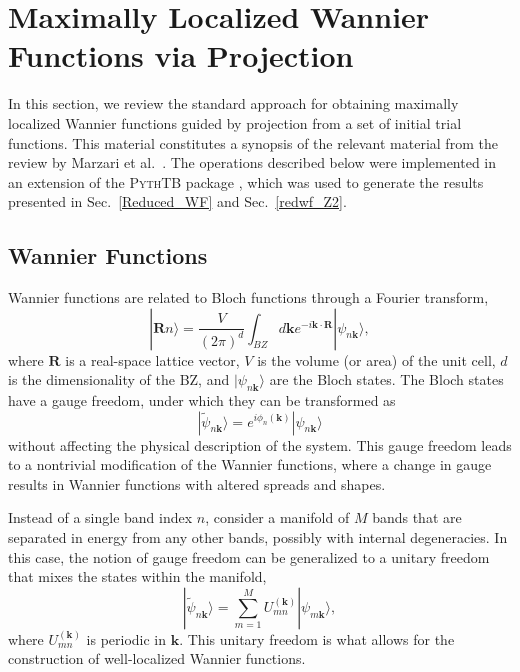 \documentclass[galley,aps,pra,10pt,amsmath,amssymb,
    superscriptaddress,nofootinbib,longbibliography]{revtex4-2}
\newcounter{comm}
\newcommand{\code}[1]{\textsc{#1}}
\begin{document}
\section{Maximally Localized Wannier Functions via Projection}
\label{sec:MLWF}

In this section, we review the standard approach for obtaining maximally localized Wannier functions guided by projection from a set of initial trial functions. This material constitutes a synopsis of the relevant material from the review by Marzari et al.~\cite{marzari2012}. The operations described below were implemented in an extension of the \code{PythTB} package \cite{pythtb, trey_cole_2025_14963659}, which was used to generate the results presented in Sec.~\ref{Reduced_WF} and Sec.~\ref{redwf_Z2}.

\subsection{Wannier Functions}

Wannier functions are related to Bloch functions through a Fourier transform,
\begin{equation}
    |\mathbf{R} n\rangle = \frac{V}{(2\pi)^d} \int_{BZ} d\mathbf{k} e^{-i\mathbf{k}\cdot \mathbf{R}} |\psi_{n\mathbf{k}}\rangle,
\end{equation}
where $\mathbf{R}$ is a real-space lattice vector, $V$ is the volume (or area) of the unit cell, $d$ is the dimensionality of the BZ, and $|\psi_{n\mathbf{k}}\rangle$ are the Bloch states. The Bloch states have a gauge freedom, under which they can be transformed as
\begin{equation}
    |\tilde{\psi}_{n\mathbf{k}}\rangle = e^{i\phi_n(\mathbf{k})} |\psi_{n\mathbf{k}}\rangle
\end{equation}
without affecting the physical description of the system. This gauge freedom leads to a nontrivial modification of the Wannier functions, where a change in gauge results in Wannier functions with altered spreads and shapes.

Instead of a single band index $n$, consider a manifold of $M$ bands that are separated in energy from any other bands, possibly with internal degeneracies. In this case, the notion of gauge freedom can be generalized to a unitary freedom that mixes the states within the manifold,
\begin{equation}
    |\tilde{\psi}_{n\mathbf{k}}\rangle = \sum_{m=1}^{M} U_{mn}^{(\mathbf{k})} |\psi_{m\mathbf{k}} \rangle ,
\end{equation}
where $U_{mn}^{(\mathbf{k})}$ is periodic in $\mathbf{k}$. This unitary freedom is what allows for the construction of well-localized Wannier functions. 
\end{document}
